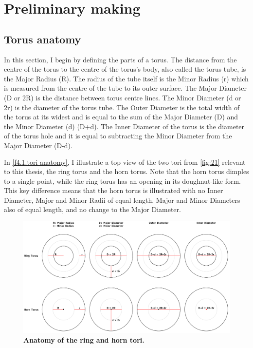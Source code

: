 \chapter{Preliminary making}

\section{Torus anatomy}
In this section, I begin by defining the parts of a torus. The distance from the centre of the torus to the centre of the torus's body, also called the torus tube, is the Major Radius (R). The radius of the tube itself is the Minor Radius (r) which is measured from the centre of the tube to its outer surface. The Major Diameter (D or 2R) is the distance between torus centre lines. The Minor Diameter (d or 2r) is the diameter of the torus tube. The Outer Diameter is the total width of the torus at its widest and is equal to the sum of the Major Diameter (D) and the Minor Diameter (d) (D+d). The Inner Diameter of the torus is the diameter of the torus hole and it is equal to subtracting the Minor Diameter from the Major Diameter (D-d). 

In \autoref{f4.1.tori anatomy}, I illustrate a top view of the two tori from \autoref{fig:21} relevant to this thesis, the ring torus and the horn torus. Note that the horn torus dimples to a single point, while the ring torus has an opening in its doughnut-like form. This key difference means that the horn torus is illustrated with no Inner Diameter, Major and Minor Radii of equal length, Major and Minor Diameters also of equal length, and no change to the Major Diameter.  

\begin{figure}[h]
    \centering
    \includegraphics[width=\linewidth]{figures/4.1 Tori anatomy.png}
    \caption[Anatomy of the ring and horn tori]{\textbf{Anatomy of the ring and horn tori.}}
    \label{f4.1.tori anatomy}
\end{figure}

